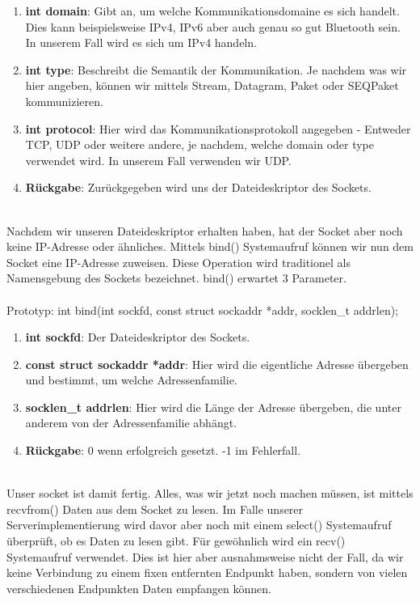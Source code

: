 \begin{enumerate}
    \item \textbf{int domain}: Gibt an, um welche Kommunikationsdomaine es sich handelt. Dies kann beispielsweise IPv4, IPv6 aber auch genau so gut Bluetooth sein. In unserem Fall wird es sich um IPv4 handeln.
    \item \textbf{int type}: Beschreibt die Semantik der Kommunikation. Je nachdem was wir hier angeben, können wir mittels Stream, Datagram, Paket oder SEQPaket kommunizieren.
    \item \textbf{int protocol}: Hier wird das Kommunikationsprotokoll angegeben - Entweder TCP, UDP oder weitere andere, je nachdem, welche domain oder type verwendet wird. In unserem Fall verwenden wir UDP.
    \item \textbf{Rückgabe}: Zurückgegeben wird uns der Dateideskriptor des Sockets.
\end{enumerate} 
\ \\%
Nachdem wir unseren Dateideskriptor erhalten haben, hat der Socket aber noch keine IP-Adresse oder ähnliches. Mittels bind() Systemaufruf können wir nun dem Socket eine IP-Adresse zuweisen. Diese Operation wird traditionel als Namensgebung des Sockets bezeichnet. bind() erwartet 3 Parameter.
\\\\
Prototyp: int bind(int sockfd, const struct sockaddr *addr, socklen\_t addrlen);
\begin{enumerate}
    \item \textbf{int sockfd}: Der Dateideskriptor des Sockets.
    \item \textbf{const struct sockaddr *addr}: Hier wird die eigentliche Adresse übergeben und bestimmt, um welche Adressenfamilie. 
    \item \textbf{socklen\_t addrlen}: Hier wird die Länge der Adresse übergeben, die unter anderem von der Adressenfamilie abhängt.
    \item \textbf{Rückgabe}: 0 wenn erfolgreich gesetzt. -1 im Fehlerfall.
\end{enumerate} 
\ \\%
Unser socket ist damit fertig. Alles, was wir jetzt noch machen müssen, ist mittels recvfrom() Daten aus dem Socket zu lesen. Im Falle unserer Serverimplementierung wird davor aber noch mit einem select() Systemaufruf überprüft, ob es Daten zu lesen gibt. Für gewöhnlich wird ein recv() Systemaufruf verwendet. Dies ist hier aber ausnahmsweise nicht der Fall, da wir keine Verbindung zu einem fixen entfernten Endpunkt haben, sondern von vielen verschiedenen Endpunkten Daten empfangen können.
